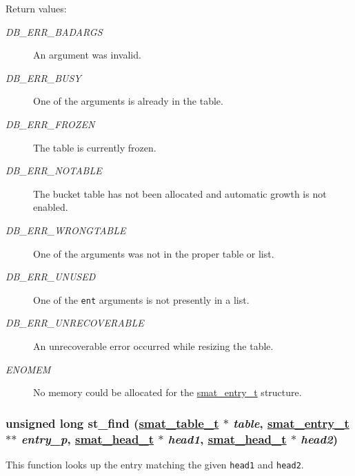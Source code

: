 \begin{Desc}
\item[Return values:]
\begin{description}
\item[{\em DB\_\-ERR\_\-BADARGS}]An argument was invalid. \item[{\em DB\_\-ERR\_\-BUSY}]One of the arguments is already in the table. \item[{\em DB\_\-ERR\_\-FROZEN}]The table is currently frozen. \item[{\em DB\_\-ERR\_\-NOTABLE}]The bucket table has not been allocated and automatic growth is not enabled. \item[{\em DB\_\-ERR\_\-WRONGTABLE}]One of the arguments was not in the proper table or list. \item[{\em DB\_\-ERR\_\-UNUSED}]One of the {\tt ent} arguments is not presently in a list. \item[{\em DB\_\-ERR\_\-UNRECOVERABLE}]An unrecoverable error occurred while resizing the table. \item[{\em ENOMEM}]No memory could be allocated for the \hyperlink{group__dbprim__smat_a2}{smat\_\-entry\_\-t} structure. \end{description}
\end{Desc}
\hypertarget{group__dbprim__smat_a12}{
\subsubsection[st\_\-find]{\setlength{\rightskip}{0pt plus 5cm}unsigned long st\_\-find (\hyperlink{dbprim_8h_a0}{smat\_\-table\_\-t} $\ast$ {\em table}, \hyperlink{dbprim_8h_a2}{smat\_\-entry\_\-t} $\ast$$\ast$ {\em entry\_\-p}, \hyperlink{dbprim_8h_a1}{smat\_\-head\_\-t} $\ast$ {\em head1}, \hyperlink{dbprim_8h_a1}{smat\_\-head\_\-t} $\ast$ {\em head2})}}
\label{group__dbprim__smat_a12}


This function looks up the entry matching the given {\tt head1} and {\tt head2}.

